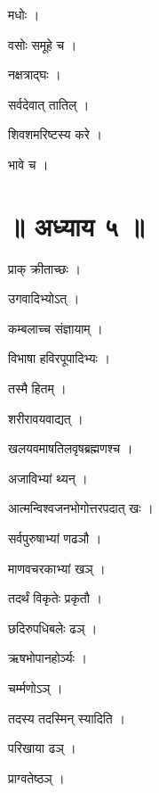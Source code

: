 \documentclass[10pt, openany]{book}
\begin{document}
\noindent मधोः ।

\noindent वसोः समूहे च ।

\noindent नक्षत्राद्घः ।

\noindent सर्वदेवात् तातिल् ।

\noindent शिवशमरिष्टस्य करे ।

\noindent भावे च ।

\section*{॥ अध्याय ५ ॥}

\noindent प्राक् क्रीताच्छः ।

\noindent उगवादिभ्योऽत् ।

\noindent कम्बलाच्च संज्ञायाम् ।

\noindent विभाषा हविरपूपादिभ्यः ।

\noindent तस्मै हितम् ।

\noindent शरीरावयवाद्यत् ।

\noindent खलयवमाषतिलवृषब्रह्मणश्च ।

\noindent अजाविभ्यां थ्यन् ।

\noindent आत्मन्विश्वजनभोगोत्तरपदात् खः ।

\noindent सर्वपुरुषाभ्यां णढञौ ।

\noindent माणवचरकाभ्यां खञ् ।

\noindent तदर्थं विकृतेः प्रकृतौ ।

\noindent छदिरुपधिबलेः ढञ् ।

\noindent ऋषभोपानहोर्ञ्यः ।

\noindent चर्म्मणोऽञ् ।

\noindent तदस्य तदस्मिन् स्यादिति ।

\noindent परिखाया ढञ् ।

\noindent प्राग्वतेष्ठञ् ।
\end{document}
